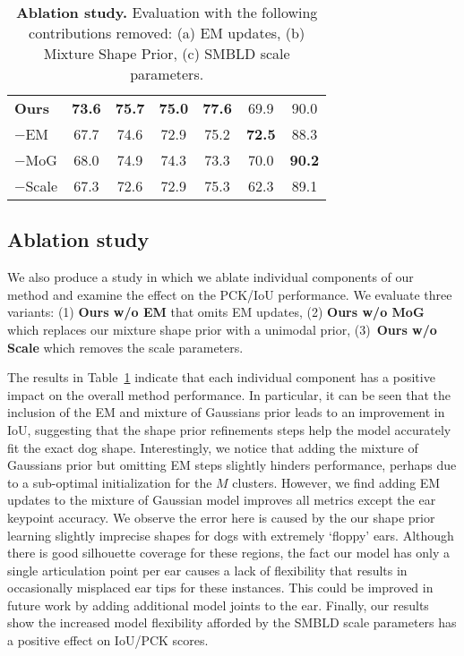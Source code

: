 \begin{table}[t!]
{\begin{tabular}{@{}lcccccc@{}}
          \midrule
          \textbf{Ours} & \textbf{73.6} & \textbf{75.7} & \textbf{75.0} & \textbf{77.6} & 69.9 & 90.0 \\
          $-$EM & 67.7 & 74.6 & 72.9 & 75.2 & \textbf{72.5} & 88.3 \\
          $-$MoG & 68.0 & 74.9 & 74.3 & 73.3 & 70.0 & \textbf{90.2} \\ 
          $-$Scale & 67.3 & 72.6 & 72.9 & 75.3 & 62.3 & 89.1 \\
          \bottomrule 
          \end{tabular}
          \vspace{1em}
          \caption{\label{tab:ablation}\textbf{Ablation study.} Evaluation with the following contributions removed: (a) EM updates, (b) Mixture Shape Prior, (c) SMBLD scale parameters.}
      }
  \end{table}
  
  
  
  \subsection{Ablation study}
  
  We also produce a study in which we ablate individual components of our method and examine the effect on the PCK/IoU performance. We evaluate three variants: (1) \textbf{Ours w/o EM} that omits EM updates, (2) \textbf{Ours w/o MoG} which replaces our mixture shape prior with a unimodal prior, (3)~\textbf{Ours w/o Scale} which removes the scale parameters. 
  
  The results in Table~\ref{tab:ablation} indicate that each individual component has a positive impact on the overall method performance. In particular, it can be seen that the inclusion of the EM and mixture of Gaussians prior leads to an improvement in IoU, suggesting that the shape prior refinements steps help the model accurately fit the exact dog shape. Interestingly, we notice that adding the mixture of Gaussians prior but omitting EM steps slightly hinders performance, perhaps due to a sub-optimal initialization for the $M$ clusters. However, we find adding EM updates to the mixture of Gaussian model improves all metrics except the ear keypoint accuracy. We observe the error here is caused by the our shape prior learning slightly imprecise shapes for dogs with extremely `floppy' ears. Although there is good silhouette coverage for these regions, the fact our model has only a single articulation point per ear causes a lack of flexibility that results in occasionally misplaced ear tips for these instances. This could be improved in future work by adding additional model joints to the ear. Finally, our results show the increased model flexibility afforded by the SMBLD scale parameters has a positive effect on IoU/PCK scores. 
  

